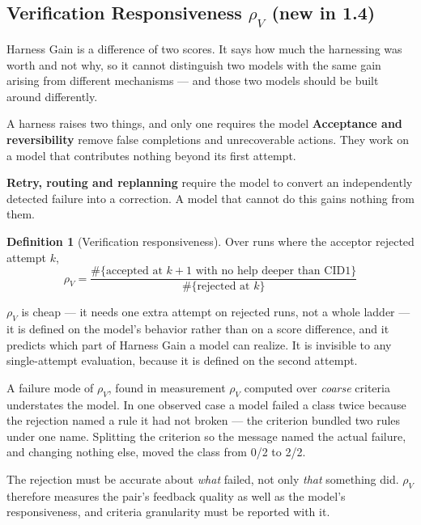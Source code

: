 \documentclass[11pt]{article}
\theoremstyle{definition}
\newtheorem{definition}{Definition}
\newcommand{\rhov}{\ensuremath{\rho_V}}
\begin{document}
\subsection{Verification Responsiveness \texorpdfstring{\rhov{}}{rho-V} (new in 1.4)}\label{sec:rhov}

Harness Gain is a difference of two scores. It says how much the harnessing was worth and not why, so it cannot distinguish two models with the same gain arising from different mechanisms --- and those two models should be built around differently.

\begin{claimbox}{A harness raises two things, and only one requires the model}
\textbf{Acceptance and reversibility} remove false completions and unrecoverable actions. They work on a model that contributes nothing beyond its first attempt.

\textbf{Retry, routing and replanning} require the model to convert an independently detected failure into a correction. A model that cannot do this gains nothing from them.
\end{claimbox}

\begin{definition}[Verification responsiveness]
Over runs where the acceptor rejected attempt $k$,
\begin{equation*}
\rhov{} = \frac{\#\{\text{accepted at } k{+}1 \text{ with no help deeper than CID1}\}}{\#\{\text{rejected at } k\}}
\end{equation*}
\end{definition}

\rhov{} is cheap --- it needs one extra attempt on rejected runs, not a whole ladder --- it is defined on the model's behavior rather than on a score difference, and it predicts which part of Harness Gain a model can realize. It is invisible to any single-attempt evaluation, because it is defined on the second attempt.

\begin{cautionbox}{A failure mode of \rhov{}, found in measurement}
\rhov{} computed over \emph{coarse} criteria understates the model. In one observed case a model failed a class twice because the rejection named a rule it had not broken --- the criterion bundled two rules under one name. Splitting the criterion so the message named the actual failure, and changing nothing else, moved the class from 0/2 to 2/2.

The rejection must be accurate about \emph{what} failed, not only \emph{that} something did. \rhov{} therefore measures the pair's feedback quality as well as the model's responsiveness, and criteria granularity must be reported with it.
\end{cautionbox}
\end{document}
